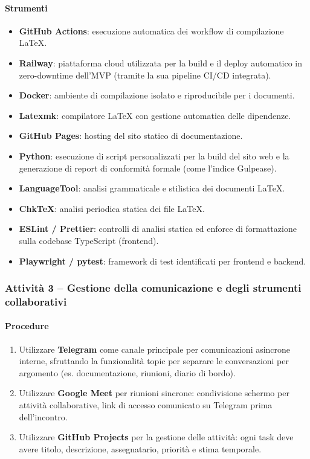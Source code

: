 \documentclass[a4paper, 11pt, oneside]{scrartcl}
\begin{document}
\paragraph{Strumenti}
\begin{itemize}
    \item \textbf{GitHub Actions}: esecuzione automatica dei workflow di compilazione \LaTeX{}.
    \item \textbf{Railway}: piattaforma cloud utilizzata per la build e il deploy automatico in zero-downtime dell'MVP (tramite la sua pipeline CI/CD integrata).
    \item \textbf{Docker}: ambiente di compilazione isolato e riproducibile per i documenti.
    \item \textbf{Latexmk}: compilatore \LaTeX{} con gestione automatica delle dipendenze.
    \item \textbf{GitHub Pages}: hosting del sito statico di documentazione.
    \item \textbf{Python}: esecuzione di script personalizzati per la build del sito web e la generazione di report di conformità formale (come l'indice Gulpease).
    \item \textbf{LanguageTool}: analisi grammaticale e stilistica dei documenti \LaTeX{}.
    \item \textbf{ChkTeX}: analisi periodica statica dei file \LaTeX{}.
    \item \textbf{ESLint / Prettier}: controlli di analisi statica ed enforce di formattazione sulla codebase TypeScript (frontend).
    \item \textbf{Playwright / pytest}: framework di test identificati per frontend e backend.
\end{itemize}

\subsubsection{Attività 3 – Gestione della comunicazione e degli strumenti collaborativi}

\paragraph{Procedure}
\begin{enumerate}
    \item Utilizzare \textbf{Telegram} come canale principale per comunicazioni asincrone interne, sfruttando la funzionalità topic{\scriptsize{}} per separare le conversazioni per argomento (es. documentazione, riunioni, diario di bordo).
    \item Utilizzare \textbf{Google Meet} per riunioni sincrone: condivisione schermo per attività collaborative, link di accesso comunicato su Telegram prima dell'incontro.
    \item Utilizzare \textbf{GitHub Projects} per la gestione delle attività: ogni task deve avere titolo, descrizione, assegnatario, priorità e stima temporale.
\end{enumerate}
\end{document}
